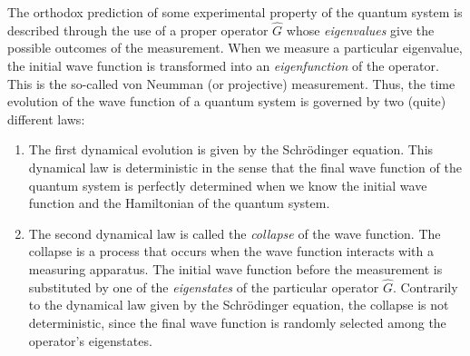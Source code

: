 \documentclass[onecolumn,nofootinbib, secnumarabic, amsmath, nobibnotes,11pt,aps,pra]{revtex4-1}
\begin{document}
The orthodox prediction of some experimental property of the quantum system is described through the use of a proper operator $\hat{G}$ whose \textit{eigenvalues} give the possible outcomes of the measurement. When we measure a particular eigenvalue, the initial wave function is transformed into an \textit{eigenfunction} of the operator. This is the so-called von Neumman (or projective) measurement.
Thus, the time evolution of the wave function of a quantum system is governed by two (quite) different laws:
\begin{enumerate}
\item The first dynamical evolution is given by the Schr\"odinger equation. This dynamical law is deterministic in the sense that the final wave function of the quantum system is perfectly determined when we know the initial wave function and the Hamiltonian of the quantum system.

\item The second dynamical law is called the \textit{collapse} of the wave function. The collapse is a process that occurs when the wave function interacts with a measuring apparatus. The initial wave function before the measurement is substituted by one of the \textit{eigenstates} of the particular operator $\hat{G}$\!. Contrarily to the dynamical law given by the Schr\"odinger equation, the collapse is not deterministic, since the final wave function is randomly selected among the operator's eigenstates.
\end{enumerate}
\end{document}
